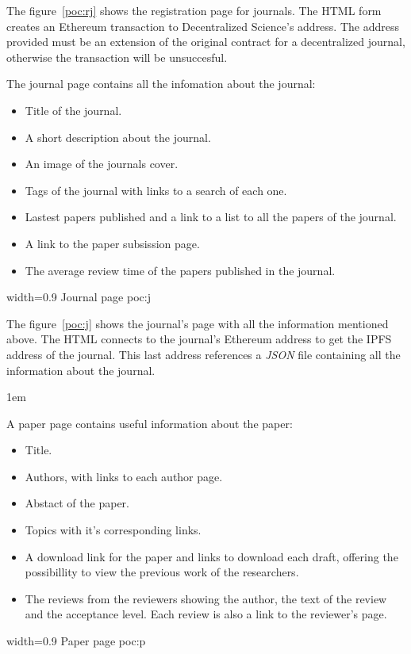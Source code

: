 The figure~\ref{poc:rj} shows the registration page for journals. The HTML form
creates an Ethereum transaction to Decentralized Science's address. The address
provided must be an extension of the original contract for a decentralized
journal, otherwise the transaction will be unsuccesful. 

The journal page contains all the infomation about the journal:
\begin{itemize}
\item Title of the journal.
\item A short description about the journal.
\item An image of the journals cover.
\item Tags of the journal with links to a search of each one.
\item Lastest papers published and a link to a list to all the papers of the
  journal.
\item A link to the paper subsission page.
\item The average review time of the papers published in the journal.
\end{itemize}

%
{width=0.9\linewidth}%
{Journal page}%
{poc:j}

The figure~\ref{poc:j} shows the journal's page with all the information
mentioned above. The HTML connects to the journal's Ethereum address to get the
IPFS address of the journal. This last address references a \emph{JSON} file
containing all the information about the journal.

\vfill{1em}


A paper page contains useful information about the paper:
\begin{itemize}
\item Title.
\item Authors, with links to each author page.
\item Abstact of the paper.
\item Topics with it's corresponding links.
\item A download link for the paper and links to download each draft, offering
  the possibillity to view the previous work of the researchers.
\item The reviews from the reviewers showing the author, the text of the review
  and the acceptance level. Each review is also a link to the reviewer's page.
\end{itemize}
%
{width=0.9\linewidth}%
{Paper page}%
{poc:p}

